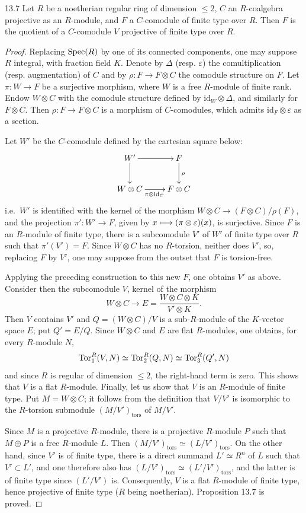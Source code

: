 \begin{proposition}{13.7}\label{VIB.13.7}
Let $R$ be a noetherian regular ring of dimension $\leq2$, $C$ an $R$-coalgebra projective as an $R$-module, and $F$ a $C$-comodule of finite type over $R$. Then $F$ is the quotient of a $C$-comodule $V$ projective of finite type over $R$.
\end{proposition}
\begin{proof}
Replacing $\operatorname{Spec}(R)$ by one of its connected components, one may suppose $R$ integral, with fraction field $K$. Denote by $\Delta$ (resp. $\varepsilon$) the comultiplication (resp. augmentation) of $C$ and by $\rho:F\to F\otimes C$ the comodule structure on $F$. Let $\pi:W\to F$ be a surjective morphism, where $W$ is a free $R$-module of finite rank. Endow $W\otimes C$ with the comodule structure defined by $\mathrm{id}_W\otimes\Delta$, and similarly for $F\otimes C$. Then $\rho:F\to F\otimes C$ is a morphism of $C$-comodules, which admits $\mathrm{id}_F\otimes\varepsilon$ as a section.

Let $W'$ be the $C$-comodule defined by the cartesian square below:
\[
\xymatrix{W'\ar[r]\ar[d]&F\ar[d]^\rho\\W\otimes C\ar[r]_{\pi\otimes\mathrm{id}_C}&F\otimes C}
\]
i.e.\ $W'$ is identified with the kernel of the morphism $W\otimes C\to(F\otimes C)/\rho(F)$, and the projection $\pi':W'\to F$, given by $x\longmapsto(\pi\otimes\varepsilon)(x)$, is surjective. Since $F$ is an $R$-module of finite type, there is a subcomodule $V'$ of $W'$ of finite type over $R$ such that $\pi'(V')=F$. Since $W\otimes C$ has no $R$-torsion, neither does $V'$, so, replacing $F$ by $V'$, one may suppose from the outset that $F$ is torsion-free.

Applying the preceding construction to this new $F$, one obtains $V'$ as above. Consider then the subcomodule $V$, kernel of the morphism
\[
W\otimes C\to E=\frac{W\otimes C\otimes K}{V'\otimes K}.
\]
Then $V$ contains $V'$ and $Q=(W\otimes C)/V$ is a sub-$R$-module of the $K$-vector space $E$; put $Q'=E/Q$. Since $W\otimes C$ and $E$ are flat $R$-modules, one obtains, for every $R$-module $N$,
\[
\operatorname{Tor}_1^R(V,N)\simeq\operatorname{Tor}_2^R(Q,N)\simeq\operatorname{Tor}_3^R(Q',N)
\]
and since $R$ is regular of dimension $\leq2$, the right-hand term is zero. This shows that $V$ is a flat $R$-module. Finally, let us show that $V$ is an $R$-module of finite type. Put $M=W\otimes C$; it follows from the definition that $V/V'$ is isomorphic to the $R$-torsion submodule $(M/V')_{\mathrm{tors}}$ of $M/V'$.

Since $M$ is a projective $R$-module, there is a projective $R$-module $P$ such that $M\oplus P$ is a free $R$-module $L$. Then $(M/V')_{\mathrm{tors}}\simeq(L/V')_{\mathrm{tors}}$. On the other hand, since $V'$ is of finite type, there is a direct summand $L'\simeq R^n$ of $L$ such that $V'\subset L'$, and one therefore also has $(L/V')_{\mathrm{tors}}\simeq(L'/V')_{\mathrm{tors}}$, and the latter is of finite type since $(L'/V')$ is. Consequently, $V$ is a flat $R$-module of finite type, hence projective of finite type ($R$ being noetherian). Proposition 13.7 is proved.
\end{proof}

